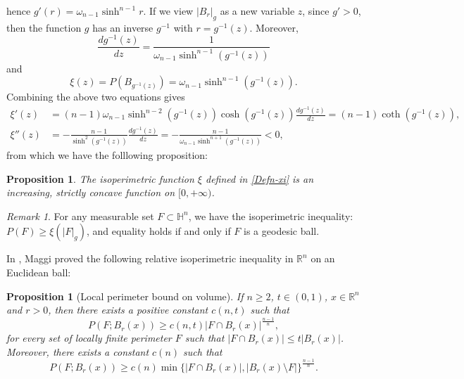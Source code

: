 \documentclass[11pt,reqno]{amsart}
\newtheorem{prop}[thm]{Proposition}
\theoremstyle{definition}
\theoremstyle{remark}
\newtheorem{rem}{Remark}
\numberwithin{equation}{section}
\renewcommand{\(}{\left(}
\renewcommand{\)}{\right)}
\renewcommand{\-}{\overline}
\begin{document}
hence $g'(r)=\omega_{n-1}\sinh^{n-1}r$. If we view $|B_r|_g$ as a new variable $z$, since $g'>0$, then the function $g$ has an inverse $g^{-1}$ with $r=g^{-1}(z)$. Moreover, 
\begin{equation*}
	\frac{dg^{-1}(z)}{dz}=\frac{1}{\omega_{n-1}\sinh^{n-1}(g^{-1}(z))}
\end{equation*}
and 
\begin{equation*}
	\xi(z)=P(B_{g^{-1}(z)})=\omega_{n-1}\sinh^{n-1}(g^{-1}(z)).
\end{equation*}
Combining the above two equations gives
\begin{align}
	\xi'(z)&=(n-1)\omega_{n-1}\sinh^{n-2}(g^{-1}(z))\cosh(g^{-1}(z))\frac{dg^{-1}(z)}{dz}=(n-1)\coth(g^{-1}(z)),\label{Eq-xi0}\\
	\xi''(z)&=-\frac{n-1}{\sinh^2(g^{-1}(z))}\frac{dg^{-1}(z)}{dz}=-\frac{n-1}{\omega_{n-1}\sinh^{n+1}(g^{-1}(z))}<0,\label{Eq-xi1}
\end{align}
from which we have the folllowing proposition:
\begin{prop}\label{Prop-concave}
	The isoperimetric function $\xi$ defined in \eqref{Defn-xi} is an increasing, strictly concave function on $[0,+\infty)$.
\end{prop} 
\begin{rem}\label{Rem-Iso}
	For any measurable set $F\subset\mathbb{H}^n$, we have the isoperimetric inequality: $P(F)\geq\xi(|F|_g)$, and equality holds if and only if $F$ is a geodesic ball.
	 \end{rem}

In \cite[Proposition 12.37; Remark 12.38]{Maggi-12}, Maggi proved the following relative isoperimetric inequality in $\mathbb{R}^n$ on an Euclidean ball:
\begin{prop}[Local perimeter bound on volume]\label{Prop-RE}
	If $n\geq 2$, $t\in(0,1)$, $x\in\mathbb{R}^n$ and $r>0$, then there exists a positive constant $c(n,t)$ such that 
	\begin{equation}\label{In-relative1}
		P(F;B_r(x))\geq c(n,t)|F\cap B_r(x)|^{\frac{n-1}{n}},
	\end{equation}
	for every set of locally finite perimeter $F$ such that $|F\cap B_r(x)|\leq t|B_r(x)|$. Moreover, there exists a constant $c(n)$ such that 
	\begin{equation}\label{In-relative2}
			P(F;B_r(x))\geq c(n)\min\{|F\cap B_r(x)|, |B_r(x)\setminus F|\}^{\frac{n-1}{n}}.
	\end{equation}
\end{prop}
\end{document}
